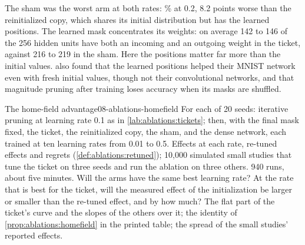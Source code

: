\begin{refsection}
The sham was the worst arm at both rates: \% at 0.2, 8.2 points worse than the reinitialized copy, which shares its initial distribution but has the learned positions. The learned mask concentrates its weights: on average 142 to 146 of the 256 hidden units have both an incoming and an outgoing weight in the ticket, against 216 to 219 in the sham. Here the positions matter far more than the initial values. \Textcite{FrankleCarbin2019} also found that the learned positions helped their MNIST network even with fresh initial values, though not their convolutional networks, and \textcite{FrankleEtAl2021} that magnitude pruning after training loses accuracy when its masks are shuffled.

\begin{lab}{The home-field advantage}{08-ablations-homefield}\label{lab:ablations:homefield}
 For each of 20 seeds: iterative pruning at learning rate 0.1 as in \cref{lab:ablations:tickets}; then, with the final mask fixed, the ticket, the reinitialized copy, the sham, and the dense network, each trained at ten learning rates from 0.01 to 0.5. Effects at each rate, re-tuned effects and regrets (\cref{def:ablations:retuned}); 10,000 simulated small studies that tune the ticket on three seeds and run the ablation on three others. 940 runs, about five minutes.
 Will the arms have the same best learning rate? At the rate that is best for the ticket, will the measured effect of the initialization be larger or smaller than the re-tuned effect, and by how much?
 The flat part of the ticket's curve and the slopes of the others over it; the identity of \cref{prop:ablations:homefield} in the printed table; the spread of the small studies' reported effects.
\end{lab}


\end{refsection}
